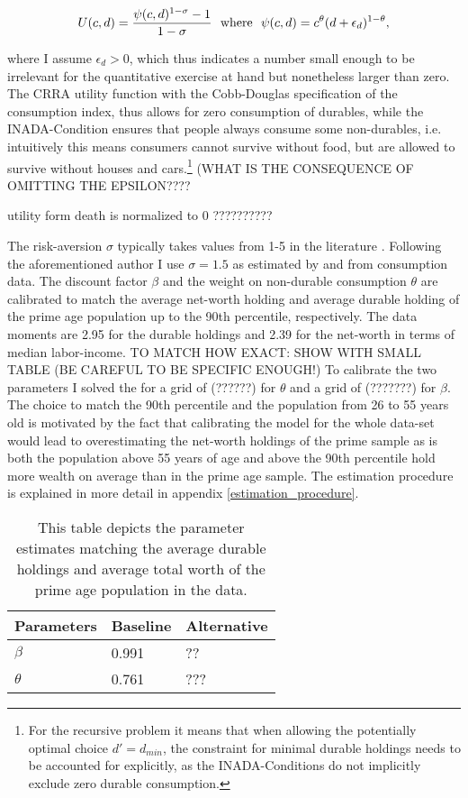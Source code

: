 \documentclass[a4paper,12pt]{article}
\begin{document}
\begin{equation}
U(c,d)=\frac{\psi(c,d)^{1-\sigma}-1}{1-\sigma} \ \ \textnormal{where} \ \ \psi(c,d)=c^{\theta}(d+\epsilon_{d})^{1-\theta},
\end{equation}

where I assume $\epsilon_{d} > 0$, which thus indicates a number small enough to be irrelevant for the quantitative exercise at hand but nonetheless larger than zero. The CRRA utility function with the Cobb-Douglas specification of the consumption index, thus allows for zero consumption of durables, while the INADA-Condition ensures that people always consume some non-durables, i.e. intuitively this means consumers cannot survive without food, but are allowed to survive without houses and cars.\footnote{For the recursive problem it means that when allowing the potentially optimal choice $d' = d_{min}$, the constraint for minimal durable holdings needs to be accounted for explicitly, as the INADA-Conditions do not implicitly exclude zero durable consumption.} (WHAT IS THE CONSEQUENCE OF OMITTING THE EPSILON???? 

\citep{FV&K2011} utility form death is normalized to 0 ??????????

The risk-aversion $\sigma$ typically takes values from 1-5 in the literature \citep{yang2009}. Following the aforementioned author I use $\sigma = 1.5$ as estimated by \cite{attanasio1999} and \cite{Gourinchas&Parker2002} from consumption data. The discount factor $\beta$ and the weight on non-durable consumption $\theta$ are calibrated to match the average net-worth holding and average durable holding of the prime age population up to the 90th percentile, respectively. The data moments are 2.95 for the durable holdings and 2.39 for the net-worth in terms of median labor-income. TO MATCH HOW EXACT: SHOW WITH SMALL TABLE (BE CAREFUL TO BE SPECIFIC ENOUGH!) To calibrate the two parameters I solved the for a grid of (??????) for $\theta$ and a grid of (???????) for $\beta$. The choice to match the 90th percentile and the population from 26 to 55 years old is motivated by the fact that calibrating the model for the whole data-set would lead to overestimating the net-worth holdings of the prime sample \textendash as is both the population above 55 years of age and above the 90th percentile hold more wealth on average than in the prime age sample. The estimation procedure is explained in more detail in appendix \ref{estimation_procedure}. 

\begin{table}[!htbp]
\centering
\caption{This table depicts the parameter estimates matching the average durable holdings and average total worth of the prime age population in the data.}
\label{estimates}
\begin{tabular}{llll}
\hline
\multicolumn{2}{l}{Parameters} & Baseline & Alternative \\ \hline
\multicolumn{2}{l}{$\beta$}             & 0.991    & ??          \\
\multicolumn{2}{l}{$\theta$}            & 0.761    & ???        
\end{tabular}
\end{table}
\end{document}
